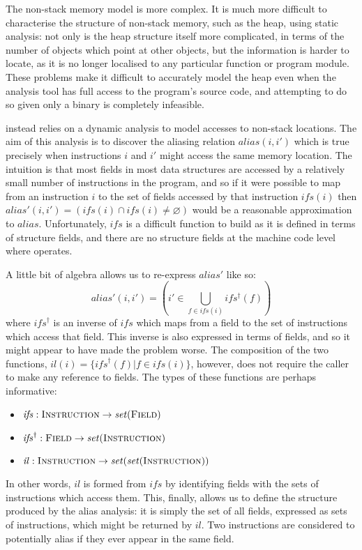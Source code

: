 {The non-stack memory model is more complex.  It is much more difficult
to characterise the structure of non-stack memory, such as the heap,
using static analysis: not only is the heap structure itself more
complicated, in terms of the number of objects which point at other
objects, but the information is harder to locate, as it is no longer
localised to any particular function or program module.  These
problems make it difficult to accurately model the heap even when the
analysis tool has full access to the program's source code\needCite{},
and attempting to do so given only a binary is completely infeasible.

{\Technique} instead relies on a dynamic analysis to model accesses to
non-stack locations.  The aim of this analysis is to discover the
aliasing relation $\mathit{alias}(i, i')$ which is true precisely when
instructions $i$ and $i'$ might access the same memory location.  The
intuition is that most fields in most data structures are accessed by
a relatively small number of instructions in the program, and so if it
were possible to map from an instruction $i$ to the set of fields
accessed by that instruction $\mathit{ifs}(i)$ then
$\mathit{alias}'(i,i') = (\mathit{ifs}(i) \cap \mathit{ifs}(i) \not=
\varnothing)$ would be a reasonable approximation to $\mathit{alias}$.
Unfortunately, $\mathit{ifs}$ is a difficult function to build as it
is defined in terms of structure fields, and there are no structure
fields at the machine code level where {\technique} operates.

A little bit of algebra allows us to re-express $\mathit{alias}'$ like
so:
\begin{displaymath}
\mathit{alias}'(i, i') = \left(i' \in \bigcup_{f \in \mathit{ifs}(i)} \mathit{ifs^{\dagger}}(f)\right)
\end{displaymath}
where $\mathit{ifs}^{\dagger}$ is an inverse of $\mathit{ifs}$ which
maps from a field to the set of instructions which access that field.
This inverse is also expressed in terms of fields, and so it might
appear to have made the problem worse.  The composition of the two
functions, $\mathit{il}(i) = \{\mathit{ifs}^{\dagger}(f) | f \in
\mathit{ifs}(i)\}$, however, does not require the caller to make any
reference to fields.  The types of these functions are perhaps
informative:
\begin{itemize}
\item $\mathit{ifs}: \textsc{Instruction} \rightarrow \mathit{set}(\textsc{Field})$
\item $\mathit{ifs}^{\dagger}: \textsc{Field} \rightarrow \mathit{set}(\textsc{Instruction})$
\item $\mathit{il}: \textsc{Instruction} \rightarrow \mathit{set}(\mathit{set}(\textsc{Instruction}))$
\end{itemize}
In other words, $\mathit{il}$ is formed from $\mathit{ifs}$ by
identifying fields with the sets of instructions which access them.
This, finally, allows us to define the structure produced by the alias
analysis: it is simply the set of all fields, expressed as sets of
instructions, which might be returned by $\mathit{il}$.  Two
instructions are considered to potentially alias if they ever appear
in the same field.

}

